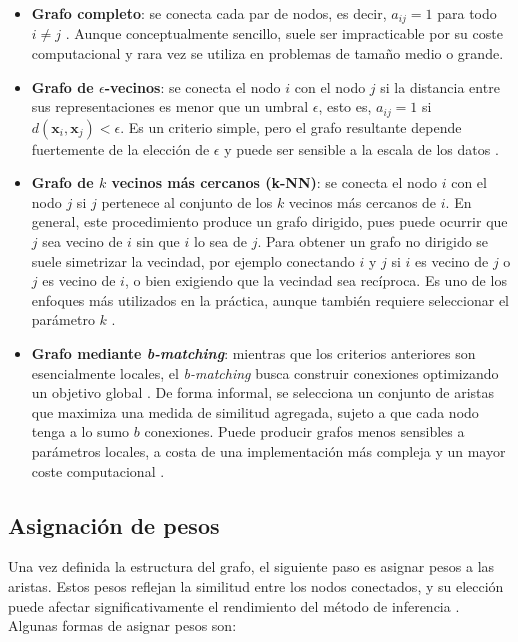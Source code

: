 \begin{itemize}
    \item \textbf{Grafo completo}: se conecta cada par de nodos, es decir, $a_{ij}=1$ para todo $i\neq j$ \cite{zhu2009introduction}. Aunque conceptualmente sencillo, suele ser impracticable por su coste computacional y rara vez se utiliza en problemas de tamaño medio o grande.
    \item \textbf{Grafo de $\epsilon$-vecinos}: se conecta el nodo $i$ con el nodo $j$ si la distancia entre sus representaciones es menor que un umbral $\epsilon$, esto es, $a_{ij}=1$ si $d(\mathbf{x}_i,\mathbf{x}_j)<\epsilon$. Es un criterio simple, pero el grafo resultante depende fuertemente de la elección de $\epsilon$ y puede ser sensible a la escala de los datos \cite{van2020survey}.
    \item \textbf{Grafo de $k$ vecinos más cercanos (k-NN)}: se conecta el nodo $i$ con el nodo $j$ si $j$ pertenece al conjunto de los $k$ vecinos más cercanos de $i$. En general, este procedimiento produce un grafo dirigido, pues puede ocurrir que $j$ sea vecino de $i$ sin que $i$ lo sea de $j$. Para obtener un grafo no dirigido se suele simetrizar la vecindad, por ejemplo conectando $i$ y $j$ si $i$ es vecino de $j$ o $j$ es vecino de $i$, o bien exigiendo que la vecindad sea recíproca. Es uno de los enfoques más utilizados en la práctica, aunque también requiere seleccionar el parámetro $k$ \cite{van2020survey}.
    \item \textbf{Grafo mediante \textit{b-matching}}: mientras que los criterios anteriores son esencialmente locales, el \textit{b-matching} busca construir conexiones optimizando un objetivo global \cite{van2020survey}. De forma informal, se selecciona un conjunto de aristas que maximiza una medida de similitud agregada, sujeto a que cada nodo tenga a lo sumo $b$ conexiones. Puede producir grafos menos sensibles a parámetros locales, a costa de una implementación más compleja y un mayor coste computacional \cite{jebara2009graph}.
\end{itemize}

\subsection{Asignación de pesos}

Una vez definida la estructura del grafo, el siguiente paso es asignar pesos a las aristas. Estos pesos reflejan la similitud entre los nodos conectados, y su elección puede afectar significativamente el rendimiento del método de inferencia \cite{van2020survey}. Algunas formas de asignar pesos son:

